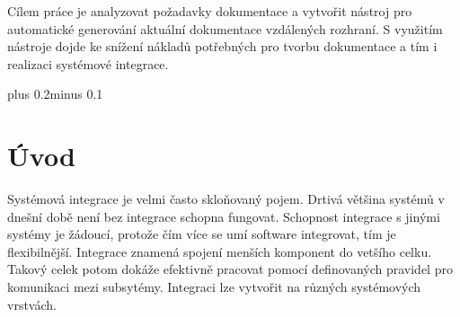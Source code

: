 \documentclass[11pt,twoside,a4paper]{book}
\begin{document}
Cílem práce je analyzovat požadavky dokumentace a vytvořit nástroj pro automatické
generování aktuální dokumentace vzdálených rozhraní. S využitím nástroje dojde ke snížení
nákladů potřebných pro tvorbu dokumentace a tím i realizaci systémové integrace.



\tableofcontents
{} 



\listoffigures



\listoftables

\lstlistoflistings 



\mainbodystarts
\normalfont
{}\baselineskip plus 0.2\baselineskip minus 0.1\baselineskip



% 
% 

% 
\chapter{Úvod} 
Systémová integrace je velmi často skloňovaný pojem. Drtivá většina systémů v dnešní době
není bez integrace schopna fungovat. Schopnost integrace s jinými systémy je žádoucí,
protože čím více se umí software integrovat, tím je flexibilnější. Integrace znamená spojení
menších komponent do vetšího celku. Takový celek potom dokáže efektivně pracovat pomocí
definovaných pravidel pro komunikaci mezi subsytémy. Integraci lze vytvořit na různých
systémových vrstvách.
\end{document}
